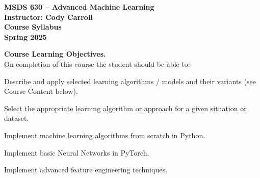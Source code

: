 \documentclass[11pt]{article}
\newenvironment{itemize*}%
  {\begin{itemize}%
    \setlength{\itemsep}{0pt}%
    \setlength{\parskip}{0pt}}%
  {\end{itemize}}
\begin{document}
\pagestyle{empty}

\noindent \begin{center}
\begin{Large}\textbf{MSDS 630 -- Advanced Machine Learning}\\
\textbf{Instructor: Cody Carroll}\\
\textbf{Course Syllabus}\\
\textbf{Spring 2025}\\\end{Large}
\end{center}

\vspace{0.05in}


\vspace{0.05in}

\noindent \textbf{Course Learning Objectives.}\\
On completion of this course the student should be able to:
\vspace{-0.05in}

\begin{itemize*}
\item Describe and apply selected learning algorithms / models and their variants (see Course Content below).
\item Select the appropriate learning algorithm or approach for a given situation or dataset.
\item Implement machine learning algorithms from scratch in Python.
\item Implement basic Neural Networks in PyTorch.
\item Implement advanced feature engineering techniques.
\end{itemize*}
\end{document}
